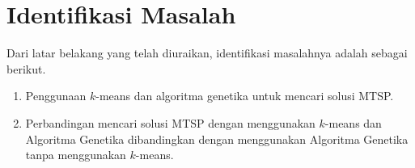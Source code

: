 \section{Identifikasi Masalah}

Dari latar belakang yang telah diuraikan,
identifikasi masalahnya adalah sebagai berikut.
\begin{enumerate}
	\item Penggunaan $k$-means dan algoritma genetika untuk mencari solusi MTSP.
	\item Perbandingan mencari solusi MTSP dengan menggunakan $k$-means dan Algoritma Genetika dibandingkan dengan menggunakan Algoritma Genetika tanpa menggunakan $k$-means.
\end{enumerate}